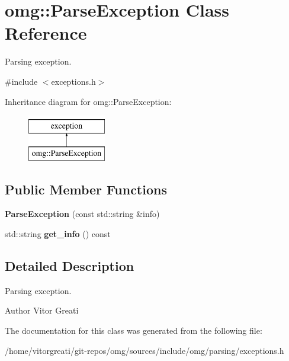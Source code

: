 \hypertarget{classomg_1_1_parse_exception}{}\section{omg\+::Parse\+Exception Class Reference}
\label{classomg_1_1_parse_exception}


Parsing exception.  




{\ttfamily \#include $<$exceptions.\+h$>$}

Inheritance diagram for omg\+::Parse\+Exception\+:\begin{figure}[H]
\begin{center}
\leavevmode
\includegraphics[height=2.000000cm]{classomg_1_1_parse_exception}
\end{center}
\end{figure}
\subsection*{Public Member Functions}
\begin{DoxyCompactItemize}
\item 
\mbox{\label{classomg_1_1_parse_exception_a37d794a188de0c719bd4807497572e5a}} 
{\bfseries Parse\+Exception} (const std\+::string \&info)
\item 
\mbox{\label{classomg_1_1_parse_exception_a7b926aa64f30abee94ab29b77c43b71c}} 
std\+::string {\bfseries get\+\_\+info} () const
\end{DoxyCompactItemize}


\subsection{Detailed Description}
Parsing exception. 

\begin{DoxyAuthor}{Author}
Vitor Greati 
\end{DoxyAuthor}


The documentation for this class was generated from the following file\+:\begin{DoxyCompactItemize}
\item 
/home/vitorgreati/git-\/repos/omg/sources/include/omg/parsing/exceptions.\+h\end{DoxyCompactItemize}

